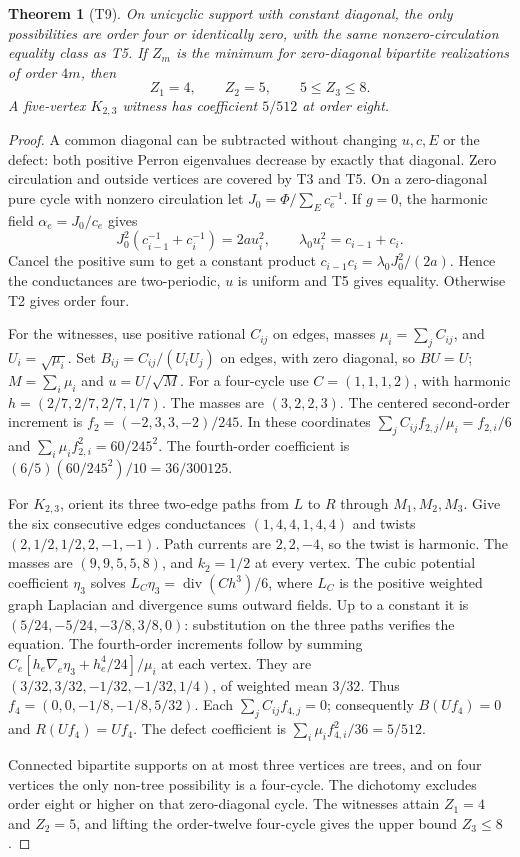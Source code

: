 \documentclass[11pt]{article}
\newtheorem{theorem}{Theorem}
\begin{document}
\begin{theorem}[T9]
On unicyclic support with constant diagonal, the only possibilities
are order four or identically zero, with the same nonzero-circulation
equality class as T5. If \(Z_m\) is the minimum for zero-diagonal
bipartite realizations of order \(4m\), then
\[
 Z_1=4,\qquad Z_2=5,\qquad 5\leq Z_3\leq8 .
\]
A five-vertex \(K_{2,3}\) witness has coefficient \(5/512\) at order eight.
\end{theorem}
\begin{proof}
A common diagonal can be subtracted without changing \(u,c,E\)
or the defect: both positive Perron eigenvalues decrease by exactly
that diagonal. Zero circulation and outside vertices are covered
by T3 and T5. On a zero-diagonal pure cycle with nonzero circulation
let \(J_0=\Phi/\sum_E c_e^{-1}\). If \(g=0\), the harmonic field
\(\alpha_e=J_0/c_e\) gives
\[
 J_0^2(c_{i-1}^{-1}+c_i^{-1})=2a u_i^2,\qquad
 \lambda_0 u_i^2=c_{i-1}+c_i .
\]
Cancel the positive sum to get a constant product
\(c_{i-1}c_i=\lambda_0J_0^2/(2a)\). Hence the conductances are
two-periodic, \(u\) is uniform and T5 gives equality. Otherwise T2
gives order four.

For the witnesses, use positive rational \(C_{ij}\) on edges, masses
\(\mu_i=\sum_j C_{ij}\), and \(U_i=\sqrt{\mu_i}\). Set
\(B_{ij}=C_{ij}/(U_iU_j)\) on edges, with zero diagonal, so \(BU=U\);
\(M=\sum_i\mu_i\) and \(u=U/\sqrt M\).
For a four-cycle use \(C=(1,1,1,2)\), with harmonic
\(h=(2/7,2/7,2/7,1/7)\). The masses are \((3,2,2,3)\).
The centered second-order increment is
\(f_2=(-2,3,3,-2)/245\). In these coordinates
\(\sum_j C_{ij}f_{2,j}/\mu_i=f_{2,i}/6\) and
\(\sum_i\mu_i f_{2,i}^2=60/245^2\).
The fourth-order coefficient is \((6/5)(60/245^2)/10=36/300125\).

For \(K_{2,3}\), orient its three two-edge paths from \(L\) to \(R\)
through \(M_1,M_2,M_3\). Give the six consecutive edges conductances
\((1,4,4,1,4,4)\) and twists \((2,1/2,1/2,2,-1,-1)\).
Path currents are \(2,2,-4\), so the twist is harmonic.
The masses are \((9,9,5,5,8)\), and \(k_2=1/2\) at every vertex.
The cubic potential coefficient \(\eta_3\) solves
\(L_C\eta_3=\operatorname{div}(C h^3)/6\), where \(L_C\) is the
positive weighted graph Laplacian and divergence sums outward fields.
Up to a constant it is \((5/24,-5/24,-3/8,3/8,0)\):
substitution on the three paths verifies the equation.
The fourth-order increments follow by summing
\(C_e[h_e\nabla_e\eta_3+h_e^4/24]/\mu_i\) at each vertex. They are
\((3/32,3/32,-1/32,-1/32,1/4)\), of weighted mean \(3/32\).
Thus \(f_4=(0,0,-1/8,-1/8,5/32)\). Each
\(\sum_j C_{ij}f_{4,j}=0\); consequently \(B(U f_4)=0\) and
\(R(U f_4)=U f_4\). The defect coefficient is
\(\sum_i\mu_i f_{4,i}^2/36=5/512\).

Connected bipartite supports on at most three vertices are trees,
and on four vertices the only non-tree possibility is a four-cycle.
The dichotomy excludes order eight or higher on that zero-diagonal
cycle. The witnesses attain \(Z_1=4\) and \(Z_2=5\), and lifting
the order-twelve four-cycle gives the upper bound \(Z_3\leq8\).
\end{proof}
\end{document}
